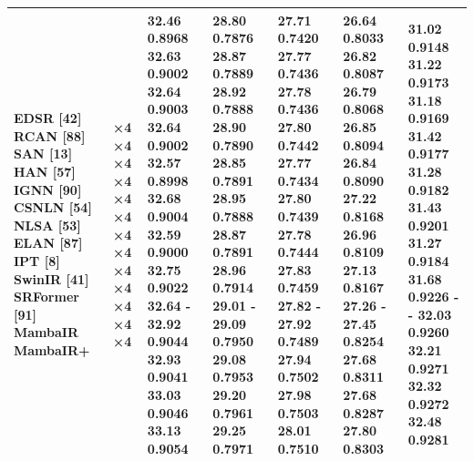 \begin{tabular}{lllllll}
EDSR [42] RCAN [88] SAN [13] HAN [57] IGNN [90] CSNLN [54] NLSA [53] ELAN [87] IPT [8] SwinIR [41] SRFormer [91] MambaIR MambaIR+ & ×4 ×4 ×4 ×4 ×4 ×4 ×4 ×4 ×4 ×4 ×4 ×4 ×4 & 32.46 0.8968 32.63 0.9002 32.64 0.9003 32.64 0.9002 32.57 0.8998 32.68 0.9004 32.59 0.9000 32.75 0.9022 32.64 - 32.92 0.9044 32.93 0.9041 33.03 0.9046 33.13 0.9054 & 28.80 0.7876 28.87 0.7889 28.92 0.7888 28.90 0.7890 28.85 0.7891 28.95 0.7888 28.87 0.7891 28.96 0.7914 29.01 - 29.09 0.7950 29.08 0.7953 29.20 0.7961 29.25 0.7971 & 27.71 0.7420 27.77 0.7436 27.78 0.7436 27.80 0.7442 27.77 0.7434 27.80 0.7439 27.78 0.7444 27.83 0.7459 27.82 - 27.92 0.7489 27.94 0.7502 27.98 0.7503 28.01 0.7510 & 26.64 0.8033 26.82 0.8087 26.79 0.8068 26.85 0.8094 26.84 0.8090 27.22 0.8168 26.96 0.8109 27.13 0.8167 27.26 - 27.45 0.8254 27.68 0.8311 27.68 0.8287 27.80 0.8303 & 31.02 0.9148 31.22 0.9173 31.18 0.9169 31.42 0.9177 31.28 0.9182 31.43 0.9201 31.27 0.9184 31.68 0.9226 - - 32.03 0.9260 32.21 0.9271 32.32 0.9272 32.48 0.9281 \\
\bottomrule
\end{tabular}
